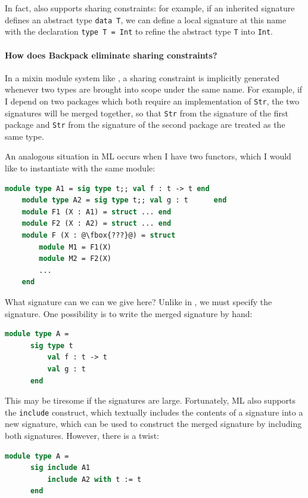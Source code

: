 \noindent
In fact, \Backpack{} also supports sharing constraints: for example,
if an inherited signature defines an abstract type \verb|data T|, we
can define a local signature at this name with the declaration \verb|type T = Int|
to refine the abstract type \verb|T| into \verb|Int|.

\paragraph{How does Backpack eliminate sharing constraints?}  In a mixin
module system like \Backpack{}, a sharing constraint is implicitly generated
whenever two types are brought into scope under the same name.  For example,
if I depend on two packages which both require an implementation of
\verb|Str|, the two signatures will be merged together, so that \verb|Str|
from the signature of the first package and \verb|Str| from the signature
of the second package are treated as the same type.

An analogous situation in ML occurs when I have two functors,
which I would like to instantiate with the same module:

\begin{lstlisting}[language=ML,escapechar=@]
    module type A1 = sig type t;; val f : t -> t end
    module type A2 = sig type t;; val g : t      end
    module F1 (X : A1) = struct ... end
    module F2 (X : A2) = struct ... end
    module F (X : @\fbox{???}@) = struct
        module M1 = F1(X)
        module M2 = F2(X)
        ...
    end
\end{lstlisting}

\noindent
What signature can we can we give here?  Unlike in \Backpack{}, we must
specify the signature.  One possibility is to write the merged signature
by hand:

\begin{lstlisting}[language=ML,escapechar=@]
    module type A =
      sig type t
          val f : t -> t
          val g : t
      end
\end{lstlisting}

\noindent
This may be tiresome if the signatures are large.  Fortunately,
ML also supports the \verb|include| construct, which textually includes
the contents of a signature into a new signature, which can be used to
construct the merged signature by including both signatures.  However, there is a twist:

\begin{lstlisting}[language=ML,escapechar=@]
    module type A =
      sig include A1
          include A2 with t := t
      end
\end{lstlisting}

